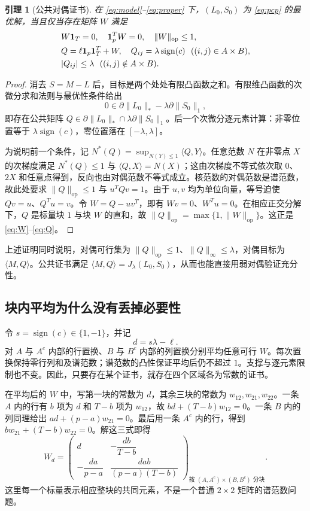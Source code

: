 \documentclass[UTF8,fontset=none,zihao=-4,a4paper]{ctexart}
\theoremstyle{plainzh}
\newtheorem{lemma}[theorem]{引理}
\newcommand{\one}{\bm 1}
\newcommand{\ip}[2]{\langle #1,#2\rangle}
\newcommand{\nuc}[1]{\lVert #1\rVert_*}
\newcommand{\op}[1]{\lVert #1\rVert_{\mathrm{op}}}
\newcommand{\ellone}[1]{\lVert #1\rVert_1}
\newcommand{\maxnorm}[1]{\lVert #1\rVert_\infty}
\newcommand{\sign}{\operatorname{sign}}
\numberwithin{equation}{section}
\begin{document}
\begin{lemma}[公共对偶证书]\label{lem:dual}
在 \eqref{eq:model}--\eqref{eq:proper} 下，$(L_0,S_0)$ 为 \eqref{eq:pcp} 的最优解，当且仅当存在矩阵 $W$ 满足
\begin{align}
 &W\one_T=0,\quad \one_p^TW=0,\quad \op W\le1,\label{eq:W}\\
 &Q=\ell\one_p\one_T^T+W,\quad
 Q_{ij}=\lambda\sign(c)\ \ ((i,j)\in A\times B),\label{eq:Q}\\
 &|Q_{ij}|\le\lambda\ \ ((i,j)\notin A\times B).\notag
\end{align}
\end{lemma}
\begin{proof}
消去 $S=M-L$ 后，目标是两个处处有限凸函数之和。有限维凸函数的次微分求和法则与最优性条件给出
\[
0\in\partial\nuc{L_0}-\lambda\partial\ellone{S_0},
\]
即存在公共矩阵 $Q\in\partial\nuc{L_0}\cap\lambda\partial\ellone{S_0}$。后一个次微分逐元素计算：非零位置等于 $\lambda\sign(c)$，零位置落在 $[-\lambda,\lambda]$。

为说明前一个条件，记 \(N^*(Q)=\sup_{N(Y)\le1}\langle Q,Y\rangle\)。任意范数 \(N\) 在非零点 \(X\) 的次梯度满足 \(N^*(Q)\le1\) 与 \(\langle Q,X\rangle=N(X)\)；这由次梯度不等式依次取 $0$、$2X$ 和任意点得到，反向也由对偶范数不等式成立。核范数的对偶范数是谱范数，故此处要求 $\op Q\le1$ 与 $u^TQv=1$。由于 $u,v$ 均为单位向量，等号迫使 $Qv=u$、$Q^Tu=v$。令 $W=Q-uv^T$，即有 $Wv=0$、$W^Tu=0$。在相应正交分解下，$Q$ 是标量块 $1$ 与块 $W$ 的直和，故 $\op Q=\max\{1,\op W\}$。这正是 \eqref{eq:W}--\eqref{eq:Q}。
\end{proof}

上述证明同时说明，对偶可行集为 $\op Q\le1$、$\maxnorm Q\le\lambda$，对偶目标为 $\ip MQ$。公共证书满足 $\ip MQ=J_\lambda(L_0,S_0)$，从而也能直接用弱对偶验证充分性。

\subsection{块内平均为什么没有丢掉必要性}

令 $s=\sign(c)\in\{1,-1\}$，并记
\begin{equation}\label{eq:delta}
 d=s\lambda-\ell.
\end{equation}
对 $A$ 与 $A^c$ 内部的行置换、$B$ 与 $B^c$ 内部的列置换分别平均任意可行 $W$。每次置换保持零行列和及谱范数；谱范数的凸性保证平均后仍不超过 $1$。支撑与逐元素限制也不变。因此，只要存在某个证书，就存在四个区域各为常数的证书。

在平均后的 \(W\) 中，写第一块的常数为 \(d\)，其余三块的常数为 \(w_{12},w_{21},w_{22}\)。一条 \(A\) 内的行有 \(b\) 项为 \(d\) 和 \(T-b\) 项为 \(w_{12}\)，故 \(bd+(T-b)w_{12}=0\)。一条 \(B\) 内的列同理给出 \(ad+(p-a)w_{21}=0\)。最后用一条 \(A^c\) 内的行，得到 \(bw_{21}+(T-b)w_{22}=0\)。解这三式即得
\begin{equation}\label{eq:fourblocks}
 W_d=\begin{pmatrix}
 d&-\dfrac{db}{T-b}\\[4pt]
 -\dfrac{da}{p-a}&\dfrac{dab}{(p-a)(T-b)}
 \end{pmatrix}_{\!\text{按 }(A,A^c)\times(B,B^c)\text{ 分块}}.
\end{equation}
这里每一个标量表示相应整块的共同元素，不是一个普通 $2\times2$ 矩阵的谱范数问题。
\end{document}
